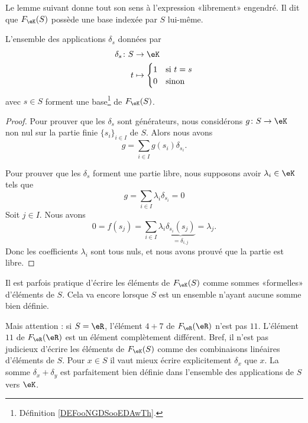 Le lemme suivant donne tout son sens à l'expression «librement» engendré. Il dit que \( F_{\eK}(S)\) possède une base indexée par \( S\) lui-même.
\begin{lemma}       \label{LEMooLOPAooUNQVku}
	L'ensemble des applications \( \delta_s\) données par
	\begin{equation}
		\begin{aligned}
			\delta_s\colon S & \to \eK                    \\
			t                & \mapsto \begin{cases}
				                           1 & \text{si } t=s \\
				                           0 & \text{sinon }
			                           \end{cases}
		\end{aligned}
	\end{equation}
	avec \( s\in S\) forment une base\footnote{Définition \ref{DEFooNGDSooEDAwTh}.} de \( F_{\eK}(S)\).
\end{lemma}

\begin{proof}
	Pour prouver que les \( \delta_s\) sont générateurs, nous considérons \( g\colon S\to \eK\) non nul sur la partie finie \( \{ s_i \}_{i\in I}\) de \( S\). Alors nous avons
	\begin{equation}
		g=\sum_{i\in I}g(s_i)\delta_{s_i}.
	\end{equation}

	Pour prouver que les \( \delta_s\) forment une partie libre, nous supposons avoir \( \lambda_i\in \eK\) tels que
	\begin{equation}
		g=\sum_{i\in I}\lambda_i\delta_{s_i}=0
	\end{equation}
	Soit \( j\in I\). Nous avons
	\begin{equation}
		0=f(s_j)=\sum_{i\in I}\lambda_i \underbrace{\delta_{s_i}(s_j)}_{=\delta_{i,j}}=\lambda_j.
	\end{equation}
	Donc les coefficients \( \lambda_i\) sont tous nuls, et nous avons prouvé que la partie est libre.
\end{proof}

Il est parfois pratique d'écrire les éléments de \( F_{\eK}(S)\) comme sommes «formelles» d'éléments de \( S\). Cela va encore lorsque \( S\) est un ensemble n'ayant aucune somme bien définie.

Mais attention : si \( S=\eR\), l'élément \( 4+7\) de \( F_{\eR}(\eR)\) n'est pas \( 11\). L'élément \( 11\) de \( F_{\eR}(\eR)\) est un élément complètement différent. Bref, il n'est pas judicieux d'écrire les éléments de \( F_{\eK}(S)\) comme des combinaisons linéaires d'éléments de \( S\). Pour \( x\in S\) il vaut mieux écrire explicitement \( \delta_x\) que \( x\). La somme \( \delta_x+\delta_y\) est parfaitement bien définie dans l'ensemble des applications de \( S\) vers \( \eK\).

